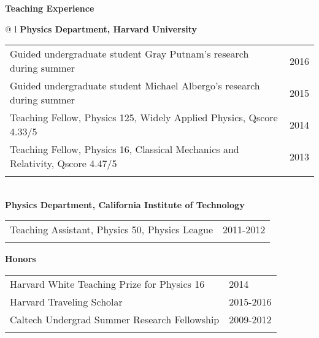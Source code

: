 \documentclass[letterpaper,11pt,oneside]{article}
\begin{document}
\raggedright
\textbf{\Large{Teaching Experience}} \\
\vspace{-0.5cm}
 \normalsize
\begin{flushleft}
\hspace{1cm}
 \begin{tabular}{@{} l}
    \textbf{Physics Department, Harvard University} \\ 
    \begin{tabular}{@{} l l }
 Guided undergraduate student Gray Putnam's research during summer & 2016\\
 Guided undergraduate student Michael Albergo's research during summer & 2015\\
 Teaching Fellow, Physics 125, Widely Applied Physics, Qscore 4.33/5  & 2014\\
 Teaching Fellow, Physics 16, Classical Mechanics and Relativity, Qscore 4.47/5 & 2013\\
    \hspace{0.8\linewidth} & \hspace{0.1\linewidth} \\
     \end{tabular}
     \\
     \textbf{Physics Department, California Institute of Technology} \\
     \begin{tabular}{@{} l l }
 Teaching Assistant, Physics 50, Physics League & 2011-2012\\
    \hspace{0.8\linewidth} & \hspace{0.1\linewidth} \\
      \end{tabular}
      \end{tabular}
\end{flushleft}

\raggedright
 \textbf{\Large{Honors}} \\
\vspace{-0.5cm}
 \normalsize
\begin{flushleft}
\hspace{1cm}
\begin{tabular}{@{} l l }
 Harvard White Teaching Prize for Physics 16 & 2014\\
 Harvard Traveling Scholar & 2015-2016\\
 Caltech Undergrad Summer Research Fellowship & 2009-2012\\
    \hspace{0.8\linewidth} & \hspace{0.1\linewidth} \\
 \end{tabular}
\end{flushleft}
\end{document}
